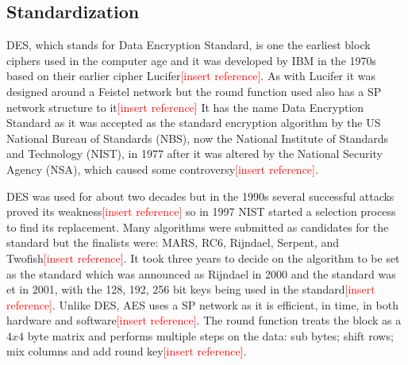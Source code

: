 \documentclass[12pt,twoside,a4paper]{report}
\begin{document}
    \subsection{Standardization}
    DES, which stands for Data Encryption Standard, is one the earliest block ciphers used in the computer age and it was developed by IBM in the 1970s based on their earlier cipher Lucifer\textcolor{red}{[insert reference]}. As with Lucifer it was designed around a Feistel network but the round function used also has a SP network structure to it\textcolor{red}{[insert reference]}
    It has the name Data Encryption Standard as it was accepted as the standard encryption algorithm by the US National Bureau of Standards (NBS), now the National Institute of Standards and Technology (NIST), in 1977 after it was altered by the National Security Agency (NSA), which caused some controversy\textcolor{red}{[insert reference]}.
    
    DES was used for about two decades but in the 1990s several successful attacks proved its weakness\textcolor{red}{[insert reference]} so in 1997 NIST started a selection process to find its replacement.
    Many algorithms were submitted as candidates for the standard but the finalists were: MARS, RC6, Rijndael, Serpent, and Twofish\textcolor{red}{[insert reference]}.
    It took three years to decide on the algorithm to be set as the standard which was announced as Rijndael in 2000 and the standard was et in 2001, with the 128, 192, 256 bit keys being used in the standard\textcolor{red}{[insert reference]}.
    Unlike DES, AES uses a SP network as it is efficient, in time, in both hardware and software\textcolor{red}{[insert reference]}.
    The round function treats the block as a $4x4$ byte matrix and performs multiple steps on the data: sub bytes; shift rows; mix columns and add round key\textcolor{red}{[insert reference]}.
    
\end{document}
